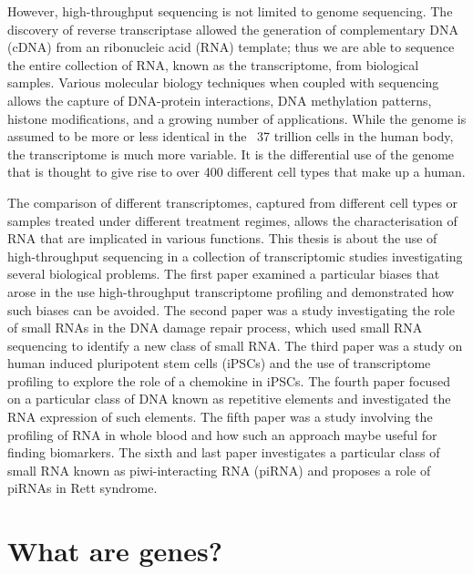 However, high-throughput sequencing is not limited to genome sequencing. The discovery of reverse transcriptase\cite{pmid4316300, pmid4316301} allowed the generation of complementary DNA (cDNA) from an ribonucleic acid (RNA) template; thus we are able to sequence the entire collection of RNA, known as the transcriptome, from biological samples. Various molecular biology techniques when coupled with sequencing allows the capture of DNA-protein interactions, DNA methylation patterns, histone modifications, and a growing number of applications\cite{applicationsofsequencing}. While the genome is assumed to be more or less identical in the ~37 trillion cells in the human body\cite{pmid23829164}, the transcriptome is much more variable. It is the differential use of the genome that is thought to give rise to over 400 different cell types\cite{pmid16790079} that make up a human.

The comparison of different transcriptomes, captured from different cell types or samples treated under different treatment regimes, allows the characterisation of RNA that are implicated in various functions. This thesis is about the use of high-throughput sequencing in a collection of transcriptomic studies investigating several biological problems. The first paper examined a particular biases that arose in the use high-throughput transcriptome profiling and demonstrated how such biases can be avoided\cite{Tang01022013}. The second paper was a study investigating the role of small RNAs in the DNA damage repair process, which used small RNA sequencing to identify a new class of small RNA\cite{francia2012site}. The third paper was a study on human induced pluripotent stem cells (iPSCs) and the use of transcriptome profiling to explore the role of a chemokine in iPSCs. The fourth paper focused on a particular class of DNA known as repetitive elements and investigated the RNA expression of such elements. The fifth paper was a study involving the profiling of RNA in whole blood and how such an approach maybe useful for finding biomarkers. The sixth and last paper investigates a particular class of small RNA known as piwi-interacting RNA (piRNA) and proposes a role of piRNAs in Rett syndrome.

\section{What are genes?}

